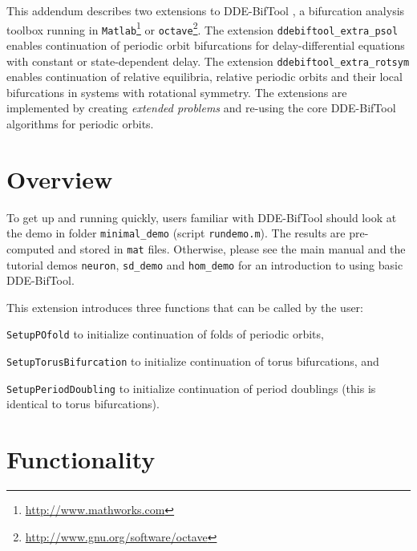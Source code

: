 \documentclass[11pt]{scrartcl}
\newcommand{\blist}[1]{\mbox{\lstinline!#1!}}  \newlength{\tabw}
\begin{document}
\maketitle
\noindent This addendum describes two extensions to DDE-BifTool
\cite{ELS01,ELR02,homoclinic,RS07,VLR08}, a bifurcation analysis
toolbox running in
\texttt{Matlab}\footnote{\url{http://www.mathworks.com}} or
\texttt{octave}\footnote{\url{http://www.gnu.org/software/octave}}. The
extension \texttt{ddebiftool\_extra\_psol} enables continuation of
periodic orbit bifurcations for delay-differential equations with
constant or state-dependent delay. The extension
\texttt{ddebiftool\_extra\_rotsym} enables continuation of relative
equilibria, relative periodic orbits and their local bifurcations in
systems with rotational symmetry. The extensions are implemented by
creating \emph{extended problems} and re-using the core DDE-BifTool
algorithms for periodic orbits.
\tableofcontents

\section{Overview}
\label{sec:quick}
To get up and running quickly, users familiar with DDE-BifTool should
look at the demo in folder \texttt{minimal\_demo} (script
\texttt{rundemo.m}). The results are pre-computed and stored in
\texttt{mat} files. Otherwise, please see the main manual and the
tutorial demos \texttt{neuron}, \texttt{sd\_demo} and \texttt{hom\_demo}
for an introduction to using basic DDE-BifTool.

\noindent This extension introduces three functions that can be called
by the user:
\begin{compactitem}
\item \blist{SetupPOfold} to initialize continuation of folds of periodic
  orbits,
\item \blist{SetupTorusBifurcation} to initialize continuation of
  torus bifurcations, and
\item \blist{SetupPeriodDoubling} to initialize
  continuation of period doublings (this is identical to torus
  bifurcations).
\end{compactitem}


\section{Functionality}
\label{sec:extra}
\end{document}
